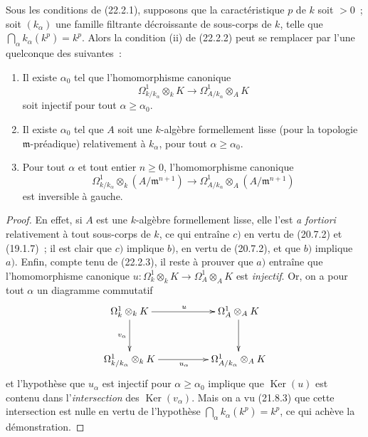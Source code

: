 \begin{proposition}[22.2.8]
\label{0.22.2.8-fr}
Sous les conditions de \textup{(22.2.1)}, supposons que la caractéristique $p$ de $k$
soit $>0$~; soit $(k_\alpha)$ une famille filtrante décroissante de
sous-corps de $k$, telle que
$\bigcap_\alpha k_\alpha(k^p)=k^p$. Alors la condition \textup{(ii)} de \textup{(22.2.2)} peut
se remplacer par l'une quelconque des suivantes~:
\begin{enumerate}
  \item[\textup{a)}] Il existe $\alpha_0$ tel que l'homomorphisme canonique
  \[
    \Omega^1_{k/k_\alpha}\otimes_kK
    \longrightarrow\Omega^1_{A/k_\alpha}\otimes_AK
  \]
  soit injectif pour tout $\alpha\geqslant\alpha_0$.
  \item[\textup{b)}] Il existe $\alpha_0$ tel que $A$ soit une $k$-algèbre
  formellement lisse (pour la topologie $\mathfrak m$-préadique) relativement
  à $k_\alpha$, pour tout $\alpha\geqslant\alpha_0$.
  \item[\textup{c)}] Pour tout $\alpha$ et tout entier $n\geqslant0$,
  l'homomorphisme canonique
  \[
    \Omega^1_{k/k_\alpha}\otimes_k(A/\mathfrak m^{n+1})
    \longrightarrow
    \Omega^1_{A/k_\alpha}\otimes_A(A/\mathfrak m^{n+1})
  \]
  est inversible à gauche.
\end{enumerate}
\end{proposition}

\begin{proof}
En effet, si $A$ est une $k$-algèbre formellement lisse, elle l'est \emph{a
fortiori} relativement à tout sous-corps de $k$, ce qui entraîne $c)$ en
vertu de (20.7.2) et (19.1.7)~; il est clair que $c)$ implique $b)$, en vertu
de (20.7.2), et que $b)$ implique $a)$. Enfin, compte tenu de (22.2.3), il
reste à prouver que $a)$ entraîne que l'homomorphisme canonique
$u:\Omega^1_k\otimes_kK\longrightarrow\Omega^1_A\otimes_AK$
est \emph{injectif}. Or, on a pour tout $\alpha$ un diagramme commutatif
\[
\xymatrix@C=5em@R=3em{
  \Omega^1_k\otimes_kK \ar[r]^{u} \ar[d]_{v_\alpha} &
  \Omega^1_A\otimes_AK \ar[d] \\
  \Omega^1_{k/k_\alpha}\otimes_kK \ar[r]_{u_\alpha} &
  \Omega^1_{A/k_\alpha}\otimes_AK
}
\]
et l'hypothèse que $u_\alpha$ est injectif pour
$\alpha\geqslant\alpha_0$ implique que $\operatorname{Ker}(u)$ est contenu
dans l'\emph{intersection} des $\operatorname{Ker}(v_\alpha)$. Mais on a vu
(21.8.3) que cette intersection est nulle en vertu de l'hypothèse
$\bigcap_\alpha k_\alpha(k^p)=k^p$, ce qui achève la démonstration.
\end{proof}

